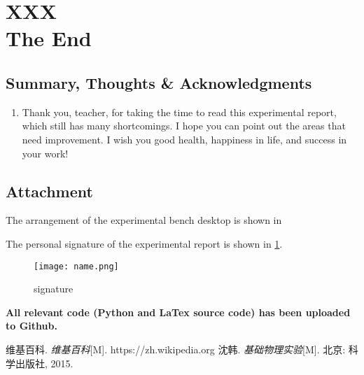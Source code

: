 
\section{XXX \\ The End}


\subsection{Summary, Thoughts \& Acknowledgments}
\begin{enumerate}
	\item Thank you, teacher, for taking the time to read this experimental report, which still has many shortcomings. I hope you can point out the areas that need improvement. I wish you good health, happiness in life, and success in your work!
\end{enumerate}


\subsection{Attachment}
The arrangement of the experimental bench desktop is shown in %

The personal signature of the experimental report is shown in \cref{fig:name}.

\begin{figure}[htbp]
	\centering
	\texttt{[image: name.png]}
	\caption{signature}
	\label{fig:name}
\end{figure}

\textbf{All relevant code (Python and LaTex source code) has been uploaded to Github.}


\renewcommand{\refname}{Reference}
\begin{thebibliography}{99}	
	 维基百科. \emph{维基百科}[M]. https://zh.wikipedia.org
	 沈韩. \emph{基础物理实验}[M]. 北京: 科学出版社, 2015.	
\end{thebibliography}